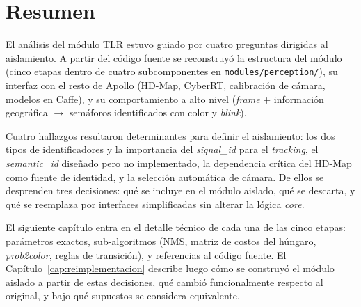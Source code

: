 \section{Resumen}

El análisis del módulo TLR estuvo guiado por cuatro preguntas dirigidas al aislamiento. A partir del código fuente se reconstruyó la estructura del módulo (cinco etapas dentro de cuatro subcomponentes en \texttt{modules/perception/}), su interfaz con el resto de Apollo (HD-Map, CyberRT, calibración de cámara, modelos en Caffe), y su comportamiento a alto nivel (\textit{frame} + información geográfica $\to$ semáforos identificados con color y \textit{blink}).

Cuatro hallazgos resultaron determinantes para definir el aislamiento: los dos tipos de identificadores y la importancia del \textit{signal\_id} para el \textit{tracking}, el \textit{semantic\_id} diseñado pero no implementado, la dependencia crítica del HD-Map como fuente de identidad, y la selección automática de cámara. De ellos se desprenden tres decisiones: qué se incluye en el módulo aislado, qué se descarta, y qué se reemplaza por interfaces simplificadas sin alterar la lógica \textit{core}.

El siguiente capítulo entra en el detalle técnico de cada una de las cinco etapas: parámetros exactos, sub-algoritmos (NMS, matriz de costos del húngaro, \textit{prob2color}, reglas de transición), y referencias al código fuente. El Capítulo~\ref{cap:reimplementacion} describe luego cómo se construyó el módulo aislado a partir de estas decisiones, qué cambió funcionalmente respecto al original, y bajo qué supuestos se considera equivalente.